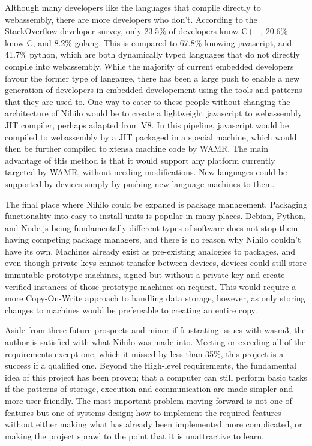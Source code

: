 \documentclass{article}
\begin{document}
Although many developers like the languages that compile directly to webassembly, there are more developers who don't. According to the StackOverflow developer survey\cite{stack}, only 23.5\% of developers know C++, 20.6\% know C, and 8.2\% golang. This is compared to 67.8\% knowing javascript, and 41.7\% python, which are both dynamically typed languages that do not directly compile into webassembly. While the majority of current embedded developers favour the former type of langauge, there has been a large push to enable a new generation of developers in embedded developement using the tools and patterns that they are used to. One way to cater to these people without changing the architecture of Nihilo would be to create a lightweight javascript to webassembly JIT compiler, perhaps adapted from V8. In this pipeline, javascript would be compiled to webassembly by a JIT packaged in a special machine, which would then be further compiled to xtensa machine code by WAMR. The main advantage of this method is that it would support any platform currently targeted by WAMR, without needing modifications. New languages could be supported by devices simply by pushing new language machines to them.

The final place where Nihilo could be expaned is package management. Packaging functionality into easy to install units is popular in many places. Debian, Python, and Node.js being fundamentally different types of software does not stop them having competing package managers, and there is no reason why Nihilo couldn't have its own. Machines already exist as pre-existing analogies to packages, and even though private keys cannot transfer between devices, devices could still store immutable prototype machines, signed but without a private key and create verified instances of those prototype machines on request. This would require a more Copy-On-Write approach to handling data storage, however, as only storing changes to machines would be prefereable to creating an entire copy.

Aside from these future prospects and minor if frustrating issues with wasm3, the author is satisfied with what Nihilo was made into. Meeting or exceding all of the requirements except one, which it missed by less than 35\%, this project is a success if a qualified one. Beyond the High-level requirements, the fundamental idea of this project has been proven; that a computer can still perform basic tasks if the patterns of storage, execution and communication are made simpler and more user friendly. The most important problem moving forward is not one of features but one of systems design; how to implement the required features without either making what has already been implemented more complicated, or making the project sprawl to the point that it is unattractive to learn.
\end{document}
